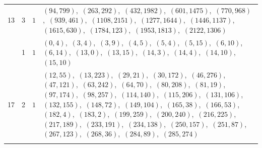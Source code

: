\documentclass[11pt]{article}
\begin{document}
\begin{longtable}{@{}rrl>{\raggedright\arraybackslash}p{}@{}}
13 & 3 & $1$ & $(94,799)$,\allowbreak\ $(263,292)$,\allowbreak\ $(432,1982)$,\allowbreak\ $(601,1475)$,\allowbreak\ $(770,968)$,\allowbreak\ $(939,461)$,\allowbreak\ $(1108,2151)$,\allowbreak\ $(1277,1644)$,\allowbreak\ $(1446,1137)$,\allowbreak\ $(1615,630)$,\allowbreak\ $(1784,123)$,\allowbreak\ $(1953,1813)$,\allowbreak\ $(2122,1306)$\\
\addlinespace[3pt]
17 & 1 & $1$ & $(0,4)$,\allowbreak\ $(3,4)$,\allowbreak\ $(3,9)$,\allowbreak\ $(4,5)$,\allowbreak\ $(5,4)$,\allowbreak\ $(5,15)$,\allowbreak\ $(6,10)$,\allowbreak\ $(6,14)$,\allowbreak\ $(13,0)$,\allowbreak\ $(13,15)$,\allowbreak\ $(14,3)$,\allowbreak\ $(14,4)$,\allowbreak\ $(14,10)$,\allowbreak\ $(15,10)$\\
17 & 2 & $1$ & $(12,55)$,\allowbreak\ $(13,223)$,\allowbreak\ $(29,21)$,\allowbreak\ $(30,172)$,\allowbreak\ $(46,276)$,\allowbreak\ $(47,121)$,\allowbreak\ $(63,242)$,\allowbreak\ $(64,70)$,\allowbreak\ $(80,208)$,\allowbreak\ $(81,19)$,\allowbreak\ $(97,174)$,\allowbreak\ $(98,257)$,\allowbreak\ $(114,140)$,\allowbreak\ $(115,206)$,\allowbreak\ $(131,106)$,\allowbreak\ $(132,155)$,\allowbreak\ $(148,72)$,\allowbreak\ $(149,104)$,\allowbreak\ $(165,38)$,\allowbreak\ $(166,53)$,\allowbreak\ $(182,4)$,\allowbreak\ $(183,2)$,\allowbreak\ $(199,259)$,\allowbreak\ $(200,240)$,\allowbreak\ $(216,225)$,\allowbreak\ $(217,189)$,\allowbreak\ $(233,191)$,\allowbreak\ $(234,138)$,\allowbreak\ $(250,157)$,\allowbreak\ $(251,87)$,\allowbreak\ $(267,123)$,\allowbreak\ $(268,36)$,\allowbreak\ $(284,89)$,\allowbreak\ $(285,274)$\\
\addlinespace[3pt]
\end{longtable}
\endgroup
\end{document}
